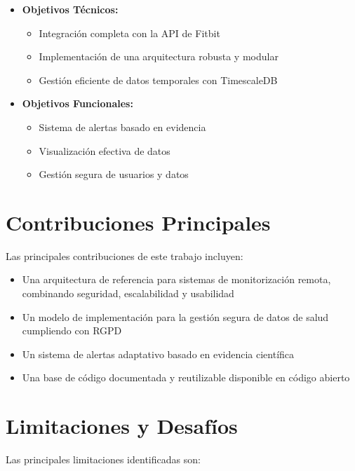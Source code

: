 \begin{itemize}
    \item \textbf{Objetivos Técnicos:}
        \begin{itemize}
            \item Integración completa con la API de Fitbit\textsuperscript{\textregistered}
            \item Implementación de una arquitectura robusta y modular
            \item Gestión eficiente de datos temporales con TimescaleDB
        \end{itemize}
    \item \textbf{Objetivos Funcionales:}
        \begin{itemize}
            \item Sistema de alertas basado en evidencia
            \item Visualización efectiva de datos
            \item Gestión segura de usuarios y datos
        \end{itemize}
\end{itemize}

\section{Contribuciones Principales}
\label{sec:contribuciones}

Las principales contribuciones de este trabajo incluyen:

\begin{itemize}
    \item Una arquitectura de referencia para sistemas de monitorización remota, combinando seguridad, escalabilidad y usabilidad
    \item Un modelo de implementación para la gestión segura de datos de salud cumpliendo con RGPD
    \item Un sistema de alertas adaptativo basado en evidencia científica
    \item Una base de código documentada y reutilizable disponible en código abierto
\end{itemize}

\section{Limitaciones y Desafíos}
\label{sec:limitaciones}

Las principales limitaciones identificadas son:

